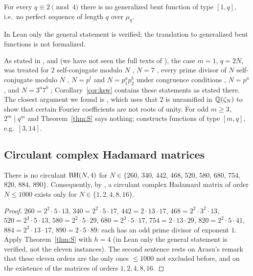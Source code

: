 \begin{corollary}\label{cor:ksw}
For every $q\equiv2\pmod4$ there is no generalized bent function of type
$[1,q]$, i.e.\ no perfect sequence of length $q$ over $\mu_q$.
\end{corollary}

\noindent In Lean only the general statement
 is verified; the translation to
generalized bent functions is not formalized.

As stated in \cite[Sect.~1]{YingDeng2026}, \cite[Sect.~1]{Arxiv260724103}
and \cite[Sect.~1]{LvZhu2018} (we have not seen the full texts of
\cite{Pei1993,Ikeda1999,Feng2001,LiuMaFeng2002,FengLiu2003b}), the case
$m=1$, $q=2N$, was treated for $2$ self-conjugate modulo $N$
\cite[Prop.~6]{KumarScholtzWelch1985}, $N=7$ \cite{Pei1993}, every prime
divisor of $N$ self-conjugate modulo $N$ \cite{Ikeda1999}, $N=p^l$ and
$N=p_1^ap_2^b$ under congruence conditions
\cite{Feng2001,LiuMaFeng2002,FengLiu2003,FengLiu2003b}, $N=p^a$
\cite{LeungSchmidt2019}, and $N=3^a7^b$ \cite[Thm.~5]{YingDeng2026};
Corollary~\ref{cor:ksw} contains these statements as stated there. The
closest argument we found is \cite[Prop.~1.3]{Arxiv260724103}, which uses
that $2$ is unramified in $\mathbb{Q}(\zeta_N)$ to show that certain Fourier
coefficients are not roots of unity. For odd $m\ge3$, $2^m\mid q^m$ and
Theorem~\ref{thm:S} says nothing; \cite{Arxiv260724103} constructs
functions of type $[m,q]$, e.g.\ $[3,14]$.

\subsection{Circulant complex Hadamard matrices}

\begin{corollary}\label{cor:arasu}
There is no circulant $\operatorname{BH}(N,4)$ for $N\in\{260$, $340$, $442$, $468$,
$520$, $580$, $680$, $754$, $820$, $884$, $890\}$.
Consequently, by \cite[Remark after Thm.~4.11]{Arasu2011}, a circulant
complex Hadamard matrix of order $N\le1000$ exists only for
$N\in\{1,2,4,8,16\}$.
\end{corollary}

\begin{proof}
$260=2^2\cdot5\cdot13$, $340=2^2\cdot5\cdot17$, $442=2\cdot13\cdot17$,
$468=2^2\cdot3^2\cdot13$, $520=2^3\cdot5\cdot13$, $580=2^2\cdot5\cdot29$,
$680=2^3\cdot5\cdot17$, $754=2\cdot13\cdot29$, $820=2^2\cdot5\cdot41$,
$884=2^2\cdot13\cdot17$, $890=2\cdot5\cdot89$: each has an odd prime
divisor of exponent $1$. Apply Theorem~\ref{thm:S} with $h=4$ (in Lean
only the general statement  is
verified, not the eleven instances). The
second sentence rests on Arasu's remark that these eleven orders are the
only ones $\le1000$ not excluded before, and on the existence of the
matrices of orders $1,2,4,8,16$.
\end{proof}

